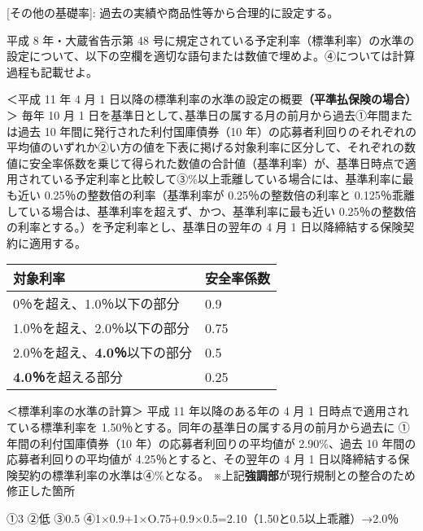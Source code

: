 \documentclass[report,gutter=10mm,fore-edge=10mm,uplatex,dvipdfmx]{jlreq}
\begin{document}
[その他の基礎率]: 過去の実績や商品性等から合理的に設定する。


平成 8 年・大蔵省告示第 48
号に規定されている予定利率（標準利率）の水準の設定について、以下の空欄を適切な語句または数値で埋めよ。④については計算過程も記載せよ。

＜平成 11 年 4 月 1
日以降の標準利率の水準の設定の概要\textbf{（平準払保険の場合）}＞ 毎年
10 月 1 日を基準日として､基準日の属する月の前月から過去①年間または過去
10 年間に発行された利付国庫債券（10
年）の応募者利回りのそれぞれの平均値のいずれか②い方の値を下表に掲げる対象利率に区分して、それぞれの数値に安全率係数を乗じて得られた数値の合計値（基準利率）が、基準日時点で適用されている予定利率と比較して③\%以上乖離している場合には、基準利率に最も近い
0.25％の整数倍の利率（基準利率が 0.25％の整数倍の利率と
0.125％乖離している場合は、基準利率を超えず、かつ、基準利率に最も近い
0.25％の整数倍の利率とする。）を予定利率とし、基準日の翌年の 4 月 1
日以降締結する保険契約に適用する。

\begin{longtable}[]{@{}ll@{}}
\toprule
対象利率 & 安全率係数\tabularnewline
\midrule
\endhead
0％を超え、1.0％以下の部分 & 0.9\tabularnewline
1.0％を超え、2.0％以下の部分 & 0.75\tabularnewline
2.0％を超え、\textbf{4.0％}以下の部分 & 0.5\tabularnewline
\textbf{4.0％}を超える部分 & 0.25\tabularnewline
\bottomrule
\end{longtable}

＜標準利率の水準の計算＞ 平成 11 年以降のある年の 4 月 1
日時点で適用されている標準利率を
1.50％とする。同年の基準日の属する月の前月から過去に
①年間の利付国庫債券（10 年）の応募者利回りの平均値が 2.90\%、過去 10
年間の応募者利回りの平均値が 4.25％とすると、その翌年の 4 月 1
日以降締結する保険契約の標準利率の水準は④\%となる。
※上記\textbf{強調部}が現行規制との整合のため修正した箇所


①3 ②低 ③0.5 ④1×0.9+1×O.75+0.9×0.5=2.10（1.50と0.5以上乖離）→2.0％





\end{document}

